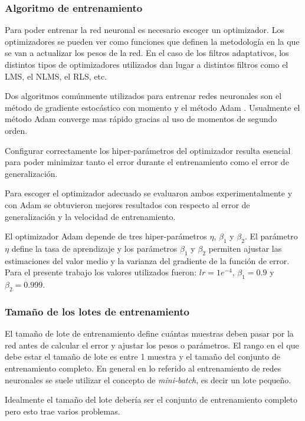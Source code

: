 \subsubsection{Algoritmo de entrenamiento}

Para poder entrenar la red neuronal es necesario escoger un optimizador. Los optimizadores se pueden ver como funciones que definen la metodología en la que se van a actualizar los pesos de la red. En el caso de los filtros adaptativos, los distintos tipos de optimizadores utilizados dan lugar a distintos filtros como el LMS, el NLMS, el RLS, etc.

Dos algoritmos comúnmente utilizados para entrenar redes neuronales son el método de gradiente estocástico con momento \cite{deep_learning} y el método Adam \cite{adam_optimizer}. Usualmente el método Adam converge mas rápido gracias al uso de momentos de segundo orden.

Configurar correctamente los hiper-parámetros del optimizador resulta esencial para poder minimizar tanto el error durante el entrenamiento como el error de generalización.

Para escoger el optimizador adecuado se evaluaron ambos experimentalmente y con Adam se obtuvieron mejores resultados con respecto al error de generalización y la velocidad de entrenamiento. 

El optimizador Adam depende de tres hiper-parámetros $\eta$, $\beta_1$ y $\beta_2$. El parámetro $\eta$ define la tasa de aprendizaje y los parámetros $\beta_1$ y $\beta_2$ permiten ajustar las estimaciones del valor medio y la varianza del gradiente de la función de error. Para el presente trabajo los valores utilizados fueron: $lr=1e^{-4}$, $\beta_1=0.9$ y $\beta_2=0.999$.

\subsubsection{Tamaño de los lotes de entrenamiento}

El tamaño de lote de entrenamiento define cuántas muestras deben pasar por la red antes de calcular el error y ajustar los pesos o parámetros. El rango en el que debe estar el tamaño de lote es entre 1 muestra y el tamaño del conjunto de entrenamiento completo. En general en lo referido al entrenamiento de redes neuronales se suele utilizar el concepto de \emph{mini-batch}, es decir un lote pequeño. 

Idealmente el tamaño del lote debería ser el conjunto de entrenamiento completo pero esto trae varios problemas.

